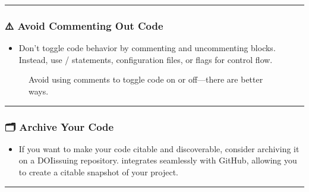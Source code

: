 \documentclass[letterpaper,10pt,english]{jupyterBook}
\let\sphinxpxdimen\pdfpxdimen\else\newdimen\sphinxpxdimen
\begin{document}
\bigskip\hrule\bigskip



\subsubsection{⚠️ Avoid Commenting Out Code}
\label{\detokenize{chapters/02/02a_coding-best-practices:avoid-commenting-out-code}}\begin{itemize}
\item {} 
\sphinxAtStartPar
Don’t toggle code behavior by commenting and uncommenting blocks. Instead, use / statements, configuration files, or flags for control flow.

\end{itemize}

\begin{figure}[htbp]
\centering
\capstart

\noindent\sphinxincludegraphics[height=380\sphinxpxdimen]{{bad_comments}.jpeg}
\caption{Avoid using comments to toggle code on or off—there are better ways.}\label{\detokenize{chapters/02/02a_coding-best-practices:bad-comments}}\end{figure}


\bigskip\hrule\bigskip



\subsubsection{🗂️ Archive Your Code}
\label{\detokenize{chapters/02/02a_coding-best-practices:archive-your-code}}\begin{itemize}
\item {} 
\sphinxAtStartPar
If you want to make your code citable and discoverable, consider archiving it on a DOI\sphinxhyphen{}issuing repository.  integrates seamlessly with GitHub, allowing you to create a citable snapshot of your project.

\end{itemize}


\bigskip\hrule\bigskip
\end{document}
